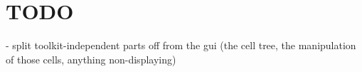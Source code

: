 \documentclass[11pt]{article}
\begin{document}
\section{TODO}

- split toolkit-independent parts off from the gui (the cell tree,
  the manipulation of those cells, anything non-displaying)


% 
% 
% 
% 
\end{document}
